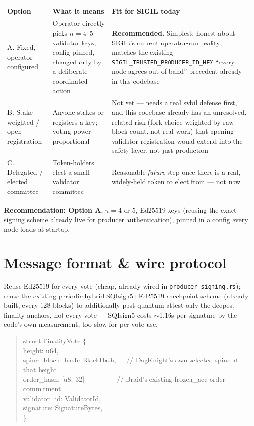 \documentclass[10pt,a4paper]{article}
\begin{document}
\begin{center}
\begin{tabular}{@{}p{2.6cm}p{5.6cm}p{5.7cm}@{}}
\toprule
\textbf{Option} & \textbf{What it means} & \textbf{Fit for SIGIL today} \\
\midrule
A. Fixed, operator-configured & Operator directly picks $n{=}4$–5 validator keys, config-pinned, changed
only by a deliberate coordinated action & \textbf{Recommended.} Simplest; honest about SIGIL's current
operator-run reality; matches the existing \texttt{SIGIL\_TRUSTED\_PRODUCER\_ID\_HEX} ``every node
agrees out-of-band'' precedent already in this codebase \\
B. Stake-weighted / open registration & Anyone stakes or registers a key; voting power proportional &
Not yet — needs a real sybil defense first, and this codebase already has an unresolved, related risk
(fork-choice weighted by raw block count, not real work) that opening validator registration would
extend into the safety layer, not just production \\
C. Delegated / elected committee & Token-holders elect a small validator committee & Reasonable
\emph{future} step once there is a real, widely-held token to elect from — not now \\
\bottomrule
\end{tabular}
\end{center}

\textbf{Recommendation: Option A}, $n{=}4$ or $5$, Ed25519 keys (reusing the exact signing scheme already
live for producer authentication), pinned in a config every node loads at startup.

\section{Message format \& wire protocol}

Reuse Ed25519 for every vote (cheap, already wired in \texttt{producer\_signing.rs}); reuse the
existing periodic hybrid SQIsign5+Ed25519 checkpoint scheme (already built, every 128 blocks) to
additionally post-quantum-attest only the deepest finality anchors, not every vote — SQIsign5 costs
$\sim$1.16s per signature by the code's own measurement, too slow for per-vote use.

\begin{quote}\small\ttfamily
struct FinalityVote \{\\
\quad height: u64,\\
\quad spine\_block\_hash: BlockHash,\ \ \ // DagKnight's own selected spine at that height\\
\quad order\_hash: [u8; 32],\ \ \ \ \ \ \ \ \ // Braid's existing frozen\_acc order commitment\\
\quad validator\_id: ValidatorId,\\
\quad signature: SignatureBytes,\\
\}
\end{quote}
\end{document}
